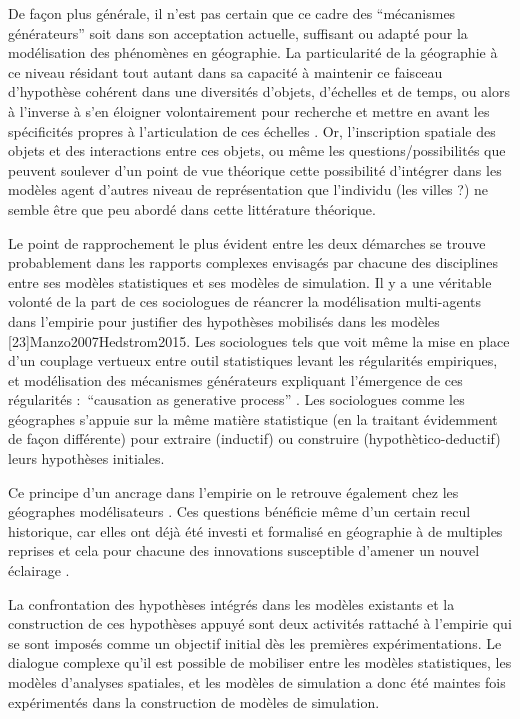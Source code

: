 De façon plus générale, il n'est pas certain que ce cadre des \enquote{mécanismes générateurs} soit dans son acceptation actuelle, suffisant ou adapté pour la modélisation des phénomènes en géographie. La particularité de la géographie à ce niveau résidant tout autant dans sa capacité à maintenir ce faisceau d'hypothèse cohérent dans une diversités d'objets, d'échelles et de temps, ou alors à l'inverse à s'en éloigner volontairement pour recherche et mettre en avant les spécificités propres à l'articulation de ces échelles \autocite{Sanders2001}. Or, l'inscription spatiale des objets et des interactions entre ces objets, ou même les questions/possibilités que peuvent soulever d'un point de vue théorique cette possibilité d'intégrer dans les modèles agent d'autres niveau de représentation que l'individu (les villes \autocite{Sanders2006} ?) ne semble être que peu abordé dans cette littérature théorique.
 
Le point de rapprochement le plus évident entre les deux démarches se trouve probablement dans les rapports complexes envisagés par chacune des disciplines entre ses modèles statistiques et ses modèles de simulation. Il y a une véritable volonté de la part de ces sociologues de réancrer  la modélisation multi-agents dans l'empirie pour justifier des hypothèses mobilisés dans les modèles \autocite{Manzo2005}[23]{Manzo2007}{Hedstrom2015}. Les sociologues tels que \textcite{Goldortorpe1999} voit même la mise en place d'un couplage vertueux entre outil statistiques levant les régularités empiriques, et modélisation des mécanismes générateurs expliquant l'émergence de ces régularités : \foreignquote{english}{causation as generative process} \autocite[50]{Manzo2005}. Les sociologues comme les géographes s'appuie sur la même matière statistique (en la traitant évidemment de façon différente) pour extraire (inductif) ou construire (hypothètico-deductif) leurs hypothèses initiales. 

Ce principe d'un ancrage dans l'empirie on le retrouve également chez les géographes modélisateurs \autocite{Banos2013}. Ces questions bénéficie même d'un certain recul historique, car elles ont déjà été investi et formalisé en géographie à de multiples reprises et cela pour chacune des innovations susceptible d'amener un nouvel éclairage \autocite{Sanders2000, Mathian2014}.

La confrontation des hypothèses intégrés dans les modèles existants \autocite{Pumain1983, Sanders1984} et la construction de ces hypothèses appuyé  \autocite{AMORAL1983} sont deux activités rattaché à l'empirie qui se sont imposés comme un objectif initial dès les premières expérimentations. Le dialogue complexe qu'il est possible de mobiliser entre les modèles statistiques, les modèles d'analyses spatiales, et les modèles de simulation a donc été maintes fois expérimentés dans la construction de modèles de simulation.

